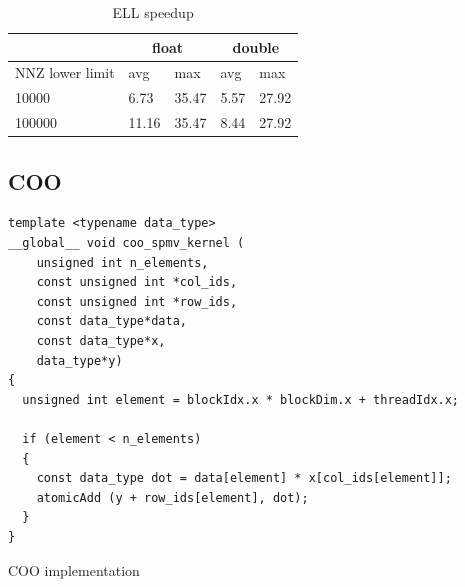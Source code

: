 \documentclass{article}
\begin{document}
\begin{table}[H]
	\centering
	\begin{tabular}{ |p{2.6cm}||p{1cm}|p{1cm}|p{1cm}|p{1cm}|  }
	 \hline
		& \multicolumn{2}{|c|}{float} & \multicolumn{2}{|c|}{double}\\
	 \hline
	 NNZ lower limit & avg & max & avg & max  \\
	 \hline
	 10000  & 6.73  & 35.47 & 5.57 & 27.92 \\
	 100000 & 11.16 & 35.47 & 8.44 & 27.92 \\
	 \hline
	\end{tabular}
	\caption{ELL speedup}
  \label{csr_ell_speedup_table}
\end{table}

\begin{figure}[H]
\centering
{}
\qquad %
\end{figure}

\subsection{COO}

\begin{listing}[H]
\begin{verbatim}
template <typename data_type>
__global__ void coo_spmv_kernel (
    unsigned int n_elements,
    const unsigned int *col_ids,
    const unsigned int *row_ids,
    const data_type*data,
    const data_type*x,
    data_type*y)
{
  unsigned int element = blockIdx.x * blockDim.x + threadIdx.x;

  if (element < n_elements)
  {
    const data_type dot = data[element] * x[col_ids[element]];
    atomicAdd (y + row_ids[element], dot);
  }
}
\end{verbatim}
\caption{COO implementation}
\label{coo_implementation}
\end{listing}
\end{document}
